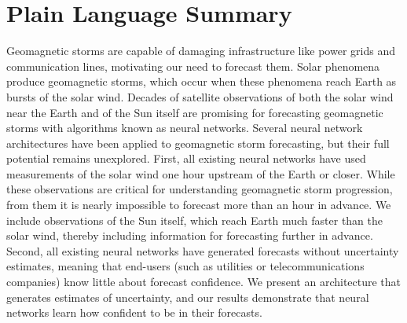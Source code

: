 \documentclass[draft,linenumbers]{agujournal2018}
\begin{document}
\section*{Plain Language Summary}
Geomagnetic storms are capable of damaging infrastructure like power grids and communication lines, motivating our need to forecast them. Solar phenomena produce geomagnetic storms, which occur when these phenomena reach Earth as bursts of the solar wind. Decades of satellite observations of both the solar wind near the Earth and of the Sun itself are promising for forecasting geomagnetic storms with algorithms known as neural networks. Several neural network architectures have been applied to geomagnetic storm forecasting, but their full potential remains unexplored. First, all existing neural networks have used measurements of the solar wind one hour upstream of the Earth or closer. While these observations are critical for understanding geomagnetic storm progression, from them it is nearly impossible to forecast more than an hour in advance. We include observations of the Sun itself, which reach Earth much faster than the solar wind, thereby including information for forecasting further in advance. Second, all existing neural networks have generated forecasts without uncertainty estimates, meaning that end-users (such as utilities or telecommunications companies) know little about forecast confidence. We present an architecture that generates estimates of uncertainty, and our results demonstrate that neural networks learn how confident to be in their forecasts.

%
%



%
%
%
%
\end{document}
